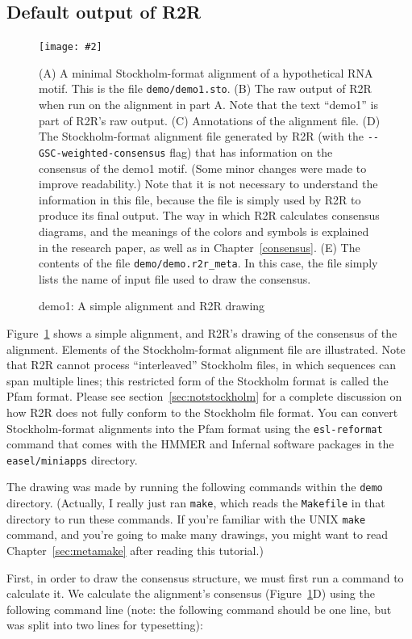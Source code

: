 \documentclass[letterpaper,12pt]{report}
\newcommand{\fig}[4]{
\begin{figure}
\texttt{[image: \#2]}
\caption{#3}

\begin{small}
#4
\end{small}
\label{#1}
\end{figure}
}
\begin{document}
\subsection{Default output of R2R}
\fig{fig:demo1}{figures/demo1.pdf}{demo1: A simple alignment and R2R drawing}{
(A)
A minimal Stockholm-format alignment of a hypothetical RNA motif.
This is the file {\tt demo/demo1.sto}.
(B)
The raw output of R2R when run on the alignment in part A.
Note that the text ``demo1'' is part of R2R's raw output.
(C)
Annotations of the alignment file.
(D)
The Stockholm-format alignment file generated by R2R
(with the {\tt -{}-GSC-weighted-consensus} flag)
 that has information on the consensus
of the demo1 motif.
(Some minor changes were made to improve readability.)
Note that it is not necessary to understand the information in this file, because the file is simply used by R2R to produce its final output.
The way in which R2R calculates consensus diagrams, and the meanings of the colors and symbols is explained in the research paper, as well as in Chapter~\ref{consensus}.
(E)
The contents of the file {\tt demo/demo.r2r\_meta}.  In this case, the file simply lists the name of input
file used to draw the consensus.
}
Figure~\ref{fig:demo1} shows a simple alignment, and R2R's drawing of the consensus of the alignment.  
Elements of the Stockholm-format alignment file are illustrated.  Note that R2R cannot process ``interleaved'' Stockholm files, in which sequences can span multiple lines; this restricted form of the Stockholm format is called the Pfam format.
Please see section~\ref{sec:notstockholm} for a complete discussion on how R2R does not fully conform to the Stockholm file format.
You can convert Stockholm-format alignments into the Pfam format using the {\tt esl-reformat} command that comes with the HMMER and Infernal software packages in the {\tt easel/miniapps} directory.

The drawing was made by running the following commands within the {\tt demo} directory.  (Actually,
I really just ran {\tt make}, which reads the {\tt Makefile} in that directory to run these commands.
If you're familiar with the UNIX {\tt make} command, and you're going to make many drawings, you might want
to read Chapter~\ref{sec:metamake} after reading this tutorial.)

First, in order to draw the consensus structure, we must first run a command
to calculate it.
We calculate the alignment's consensus (Figure~\ref{fig:demo1}D) using the following command line (note: the following command should be one line, but was split into two lines for typesetting):
\end{document}
